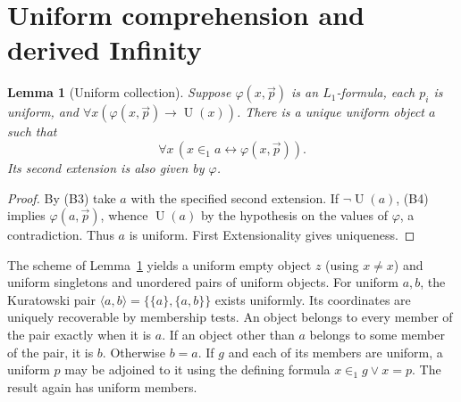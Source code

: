 \documentclass[11pt,a4paper]{article}
\numberwithin{equation}{section}
\newtheorem{lemma}[theorem]{Lemma}
\theoremstyle{definition}
\theoremstyle{remark}
\newcommand{\Unif}{\operatorname{U}}
\newcommand{\extone}{\in_1}
\begin{document}
\section{Uniform comprehension and derived Infinity}\label{sec:infinity}
\begin{lemma}[Uniform collection]\label{lem:collection}
Suppose $\varphi(x,\vec p)$ is an $L_1$-formula, each $p_i$ is uniform, and $\forall x(\varphi(x,\vec p)\to\Unif(x))$. There is a unique uniform object $a$ such that
\[\forall x\,(x\extone a\leftrightarrow\varphi(x,\vec p)).\]
Its second extension is also given by $\varphi$.
\end{lemma}
\begin{proof}
By (B3) take $a$ with the specified second extension. If $\neg\Unif(a)$, (B4) implies $\varphi(a,\vec p)$, whence $\Unif(a)$ by the hypothesis on the values of $\varphi$, a contradiction. Thus $a$ is uniform. First Extensionality gives uniqueness.
\end{proof}
The scheme of Lemma~\ref{lem:collection} yields a uniform empty object $z$ (using $x\ne x$) and uniform singletons and unordered pairs of uniform objects. For uniform $a,b$, the Kuratowski pair $\langle a,b\rangle=\{\{a\},\{a,b\}\}$ exists uniformly. Its coordinates are uniquely recoverable by membership tests. An object belongs to every member of the pair exactly when it is $a$. If an object other than $a$ belongs to some member of the pair, it is $b$. Otherwise $b=a$. If $g$ and each of its members are uniform, a uniform $p$ may be adjoined to it using the defining formula $x\extone g\lor x=p$. The result again has uniform members.
\end{document}
